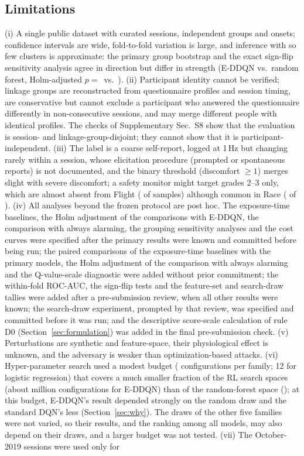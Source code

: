 \subsection{Limitations}
\label{sec:limits}
(i) A single public dataset with \nSessionsEval{} curated sessions, \nGroupsEval{} independent groups and \nEventSessions{} onsets; confidence intervals are wide, fold-to-fold variation is large, and inference with so few clusters is approximate: the primary group bootstrap and the exact sign-flip sensitivity analysis agree in direction but differ in strength (E-DDQN vs.\ random forest, Holm-adjusted $p=$\,\PHHolmRF{} vs.\ \PHSfRFHolm). (ii) Participant identity cannot be verified; linkage groups are reconstructed from questionnaire profiles and session timing, are conservative but cannot exclude a participant who answered the questionnaire differently in non-consecutive sessions, and may merge different people with identical profiles. The checks of Supplementary Sec.~S8 show that the evaluation is session- and linkage-group-disjoint; they cannot show that it is participant-independent. (iii) The label is a coarse self-report, logged at 1\,Hz but changing rarely within a session, whose elicitation procedure (prompted or spontaneous reports) is not documented, and the binary threshold (discomfort $\ge1$) merges slight with severe discomfort; a safety monitor might target grades 2--3 only, which are almost absent from Flight (\PHGradeFlightSevere{} of \PHGradeFlightSamples{} samples) although common in Race (\PHGradeRaceSevere{} of \PHGradeRaceSamples). (iv) All analyses beyond the frozen protocol are post hoc. The exposure-time baselines, the Holm adjustment of the comparisons with E-DDQN, the comparison with always alarming, the grouping sensitivity analyses and the cost curves were specified after the primary results were known and committed before being run; the paired comparisons of the exposure-time baselines with the primary models, the Holm adjustment of the comparison with always alarming and the Q-value-scale diagnostic were added without prior commitment; the within-fold ROC-AUC, the sign-flip tests and the feature-set and search-draw tallies were added after a pre-submission review, when all other results were known; the search-draw experiment, prompted by that review, was specified and committed before it was run; and the descriptive score-scale calculation of rule D0 (Section~\ref{sec:formulation}) was added in the final pre-submission check. (v) Perturbations are synthetic and feature-space, their physiological effect is unknown, and the adversary is weaker than optimization-based attacks. (vi) Hyper-parameter search used a modest budget (\HPOBudget{} configurations per family; 12 for logistic regression) that covers a much smaller fraction of the RL search spaces (about \PHSpaceEDDQNMillion{} million configurations for E-DDQN) than of the random-forest space (\PHSpaceRF); at this budget, E-DDQN's result depended strongly on the random draw and the standard DQN's less (Section~\ref{sec:why}). The draws of the other five families were not varied, so their results, and the ranking among all models, may also depend on their draws, and a larger budget was not tested. (vii) The October-2019 sessions were used only for 